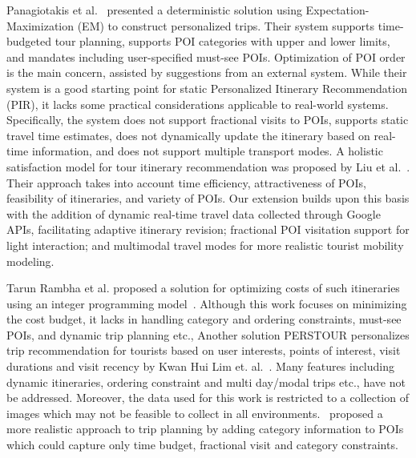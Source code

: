 Panagiotakis et al.~\cite{panagiotakis2024expectation}  presented a deterministic solution using Expectation-Maximization (EM) to construct personalized trips. Their system supports time-budgeted tour planning, supports POI categories with upper and lower limits, and mandates including user-specified must-see POIs. Optimization of POI order is the main concern, assisted by suggestions from an external system. While their system is a good starting point for static Personalized Itinerary Recommendation (PIR), it lacks some practical considerations applicable to real-world systems. Specifically, the system does not support fractional visits to POIs, supports static travel time estimates, does not dynamically update the itinerary based on real-time information, and does not support multiple transport modes. A holistic satisfaction model for tour itinerary recommendation was proposed by Liu et al.~\cite{liu2024personalized}. Their approach takes into account time efficiency, attractiveness of POIs, feasibility of itineraries, and variety of POIs. Our extension builds upon this basis with the addition of dynamic real-time travel data collected through Google APIs, facilitating adaptive itinerary revision; fractional POI visitation support for light interaction; and multimodal travel modes for more realistic tourist mobility modeling. 

Tarun Rambha et al.  proposed a solution for optimizing costs of such itineraries using an integer programming model~\cite{rambha2024optimized}. Although this work focuses on minimizing the cost budget, it lacks in handling category and ordering constraints, must-see POIs, and dynamic trip planning etc., Another solution PERSTOUR personalizes trip recommendation for tourists based on user interests, points of interest, visit durations and visit recency by Kwan Hui Lim et. al.~\cite{lim2018personalized}. Many features including dynamic itineraries, ordering constraint and multi day/modal trips etc., have not be addressed. Moreover, the data used for this work is restricted to a collection of images which may not be feasible to collect in all environments.~\cite{bolzoni2014efficient} proposed a more realistic approach to trip planning by adding category information to POIs which could capture only time budget, fractional visit and category constraints. 

